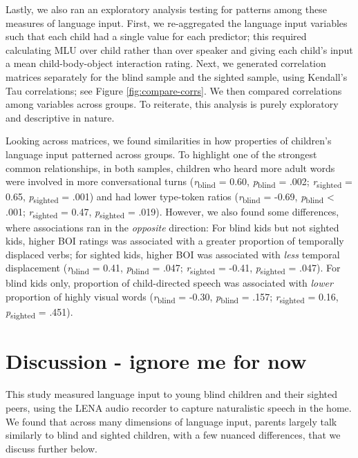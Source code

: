 \documentclass[
  man,floatsintext]{apa6}
\begin{document}
Lastly, we also ran an exploratory analysis testing for patterns among these measures of language input. First, we re-aggregated the language input variables such that each child had a single value for each predictor; this required calculating MLU over child rather than over speaker and giving each child's input a mean child-body-object interaction rating. Next, we generated correlation matrices separately for the blind sample and the sighted sample, using Kendall's Tau correlations; see Figure \ref{fig:compare-corrs}. We then compared correlations among variables across groups. To reiterate, this analysis is purely exploratory and descriptive in nature.

Looking across matrices, we found similarities in how properties of children's language input patterned across groups. To highlight one of the strongest common relationships, in both samples, children who heard more adult words were involved in more conversational turns (\emph{r}\textsubscript{blind} = 0.60, \emph{p}\textsubscript{blind} = .002; \emph{r}\textsubscript{sighted} = 0.65, \emph{p}\textsubscript{sighted} = .001) and had lower type-token ratios (\emph{r}\textsubscript{blind} = -0.69, \emph{p}\textsubscript{blind} \textless{} .001; \emph{r}\textsubscript{sighted} = 0.47, \emph{p}\textsubscript{sighted} = .019). However, we also found some differences, where associations ran in the \emph{opposite} direction: For blind kids but not sighted kids, higher BOI ratings was associated with a greater proportion of temporally displaced verbs; for sighted kids, higher BOI was associated with \emph{less} temporal displacement (\emph{r}\textsubscript{blind} = 0.41, \emph{p}\textsubscript{blind} = .047; \emph{r}\textsubscript{sighted} = -0.41, \emph{p}\textsubscript{sighted} = .047). For blind kids only, proportion of child-directed speech was associated with \emph{lower} proportion of highly visual words (\emph{r}\textsubscript{blind} = -0.30, \emph{p}\textsubscript{blind} = .157; \emph{r}\textsubscript{sighted} = 0.16, \emph{p}\textsubscript{sighted} = .451).

\hypertarget{discussion---ignore-me-for-now}{%
\section{Discussion - ignore me for now}\label{discussion---ignore-me-for-now}}

This study measured language input to young blind children and their sighted peers, using the LENA audio recorder to capture naturalistic speech in the home. We found that across many dimensions of language input, parents largely talk similarly to blind and sighted children, with a few nuanced differences, that we discuss further below.
\end{document}
